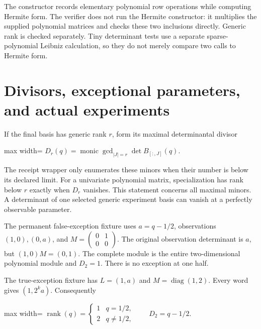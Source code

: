 \documentclass[
  11pt,
  a4paper,
]{report}
\begin{document}
The constructor records elementary polynomial row operations while
computing Hermite form. The verifier does not run the Hermite
constructor: it multiplies the supplied polynomial matrices and checks
these two inclusions directly. Generic rank is checked separately. Tiny
determinant tests use a separate sparse-polynomial Leibniz calculation,
so they do not merely compare two calls to Hermite form.

\hypertarget{divisors-exceptional-parameters-and-actual-experiments}{%
\section{Divisors, exceptional parameters, and actual
experiments}\label{divisors-exceptional-parameters-and-actual-experiments}}

If the final basis has generic rank \(r\), form its maximal
determinantal divisor

\begin{center}
\begin{adjustbox}{max width=\linewidth}
$\displaystyle
 D_r(q)=\operatorname{monic}\gcd_{|J|=r}\det B_{[:,J]}(q).
$
\end{adjustbox}
\end{center}

The receipt wrapper only enumerates these minors when their number is
below its declared limit. For a univariate polynomial matrix,
specialization has rank below \(r\) exactly when \(D_r\) vanishes. This
statement concerns all maximal minors. A determinant of one selected
generic experiment basis can vanish at a perfectly observable parameter.

The permanent false-exception fixture uses \(a=q-1/2\), observations
\((1,0),(0,a)\), and
\(M=\left(\begin{smallmatrix}0&1\\0&0\end{smallmatrix}\right)\). The
original observation determinant is \(a\), but \((1,0)M=(0,1)\). The
complete module is the entire two-dimensional polynomial module and
\(D_2=1\). There is no exception at one half.

The true-exception fixture has \(L=(1,a)\) and
\(M=\operatorname{diag}(1,2)\). Every word gives \((1,2^ka)\).
Consequently

\begin{center}
\begin{adjustbox}{max width=\linewidth}
$\displaystyle
 \operatorname{rank}(q)=\begin{cases}1&q=1/2,\\2&q\ne1/2,\end{cases}
 \qquad D_2=q-1/2.
$
\end{adjustbox}
\end{center}
\end{document}
